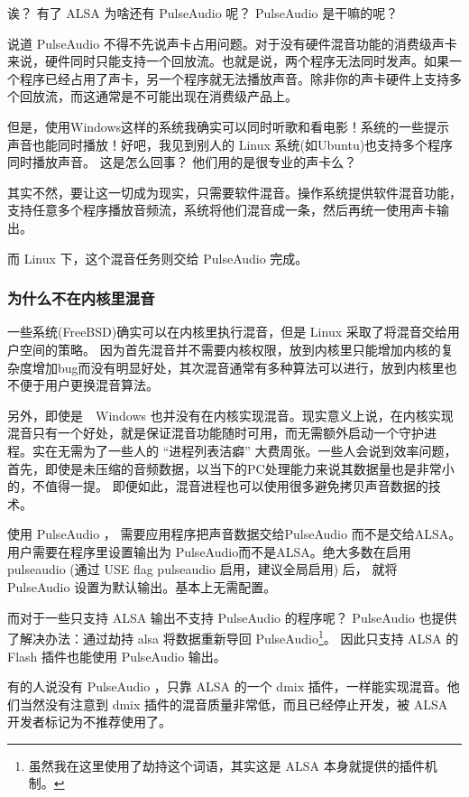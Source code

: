 诶？ 有了 ALSA 为啥还有 PulseAudio 呢？ PulseAudio 是干嘛的呢？

说道 PulseAudio 不得不先说声卡占用问题。对于没有硬件混音功能的消费级声卡来说，硬件同时只能支持一个回放流。也就是说，两个程序无法同时发声。如果一个程序已经占用了声卡，另一个程序就无法播放声音。除非你的声卡硬件上支持多个回放流，而这通常是不可能出现在消费级产品上。

但是，使用Windows这样的系统我确实可以同时听歌和看电影！系统的一些提示声音也能同时播放！好吧，我见到别人的 Linux 系统(如Ubuntu)也支持多个程序同时播放声音。
这是怎么回事？ 他们用的是很专业的声卡么？

其实不然，要让这一切成为现实，只需要软件混音。操作系统提供软件混音功能，支持任意多个程序播放音频流，系统将他们混音成一条，然后再统一使用声卡输出。

而 Linux 下，这个混音任务则交给 PulseAudio 完成。

\begin{notice}
\subsubsection*{为什么不在内核里混音}

一些系统(FreeBSD)确实可以在内核里执行混音，但是 Linux 采取了将混音交给用户空间的策略。 因为首先混音并不需要内核权限，放到内核里只能增加内核的复杂度增加bug而没有明显好处，其次混音通常有多种算法可以进行，放到内核里也不便于用户更换混音算法。

另外，即使是　Windows 也并没有在内核实现混音。现实意义上说，在内核实现混音只有一个好处，就是保证混音功能随时可用，而无需额外启动一个守护进
程。实在无需为了一些人的 “进程列表洁癖” 大费周张。一些人会说到效率问题，首先，即使是未压缩的音频数据，以当下的PC处理能力来说其数据量也是非常小的，不值得一提。
即便如此，混音进程也可以使用很多避免拷贝声音数据的技术。

\end{notice}

使用 PulseAudio ， 需要应用程序把声音数据交给PulseAudio 而不是交给ALSA。 用户需要在程序里设置输出为 PulseAudio而不是ALSA。绝大多数在启用  pulseaudio (通过 USE flag pulseaudio 启用，建议全局启用) 后，
就将  PulseAudio 设置为默认输出。基本上无需配置。

而对于一些只支持 ALSA 输出不支持 PulseAudio 的程序呢？ PulseAudio 也提供了解决办法：通过劫持 alsa 将数据重新导回 PulseAudio\footnote{虽然我在这里使用了劫持这个词语，其实这是 ALSA 本身就提供的插件机制。}。 因此只支持 ALSA  的 Flash 插件也能使用 PulseAudio 输出。

有的人说没有 PulseAudio ，只靠 ALSA 的一个 dmix 插件，一样能实现混音。他们当然没有注意到 dmix 插件的混音质量非常低，而且已经停止开发，被 ALSA 开发者标记为不推荐使用了。

